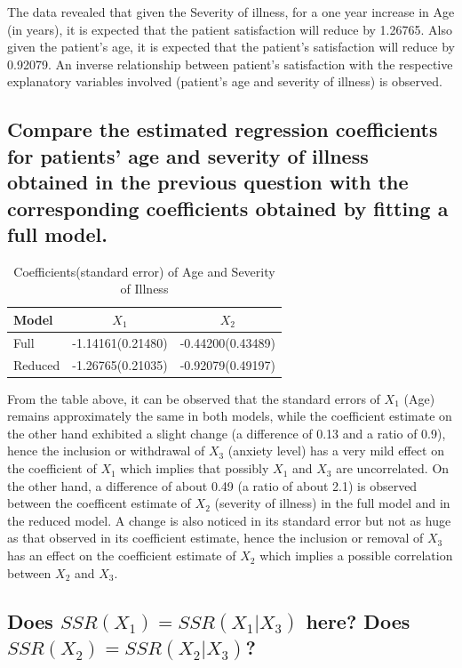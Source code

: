\documentclass[a4paper,9pt]{article}\usepackage[]{graphicx}\usepackage[]{color}
\begin{document}
The data revealed that given the Severity of illness, for a one year increase in Age (in years), it is expected that the patient satisfaction will reduce by 1.26765. Also given the patient's age, it is expected that the patient's satisfaction will reduce by  0.92079. An inverse relationship between patient's satisfaction with the respective explanatory variables involved (patient's age and severity of illness) is observed.

\subsection*{Compare the estimated regression coefficients for patients' age and severity of illness obtained in the previous question with the corresponding coefficients obtained by fitting a full model.}

\begin{table}[H]
\centering
\begin{tabular}{lcc}
\hline
Model & $X_{1}$ & $X_{2}$\\
\hline
Full &  -1.14161(0.21480) & -0.44200(0.43489)\\
Reduced & -1.26765(0.21035) & -0.92079(0.49197)\\
\hline
\end{tabular}
\caption{Coefficients(standard error) of Age and Severity of Illness}
\end{table}

From the table above, it can be observed that the standard errors of $X_1$ (Age) remains approximately the same in both models, while the coefficient estimate on the other hand exhibited a slight change (a difference of 0.13 and a ratio of 0.9), hence the inclusion or withdrawal of $X_3$ (anxiety level) has a very mild effect on the coefficient of $X_1$ which implies that possibly $X_1$ and $X_3$ are uncorrelated. On the other hand, a difference  of about 0.49 (a ratio of about 2.1) is observed between the coefficent estimate of $X_2$ (severity of illness) in the full model and in the reduced model. A change is also noticed in its standard error but not as huge as that observed in its coefficient estimate, hence the inclusion or removal of $X_3$ has an effect on the coefficient estimate of $X_2$ which implies a possible correlation between $X_2$ and $X_3$.

\subsection*{Does $SSR(X_1) = SSR(X_1|X_3)$ here? Does $SSR(X_2) = SSR(X_2|X_3)$? }
\end{document}
